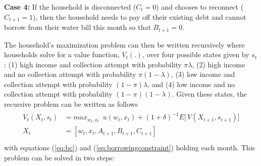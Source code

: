 \documentclass[12pt]{article}
\begin{document}
\textbf{Case 4:} If the household is disconnected ($C_t=0$) and chooses to reconnect ($C_{t+1}=1$), then the household needs to pay off their existing debt and cannot borrow from their water bill this month so that $B_{t+1} = 0$.  

The household's maximization problem can then be written recursively where households solve for a value function, $V_t(.)$, over four possible states given by $s_{t}$: (1) high income and collection attempt with probability $\pi\lambda$, (2) high income and no collection attempt with probability $\pi(1-\lambda)$, (3) low income and collection attempt with probability $(1-\pi)\lambda$, and (4) low income and no collection attempt with probability $(1-\pi)(1-\lambda)$.  Given these states, the recursive problem can be written as follows
\begin{align*}
\begin{split}
V_t(X_{t},s_t) &= max_{w_t,x_{t}} \,\,\, u(w_{t},x_{t}) + (1+\delta)^{-1}  E \Big[\, V(X_{t+1},s_{t+1})\Big] \\
X_t &= [w_t,x_t,A_{t+1},B_{t+1},C_{t+1}] \\
\end{split}
\end{align*}
with equations (\ref{eq:bc}) and (\ref{eq:borrowingconstraint}) holding each month.  This problem can be solved in two steps: 

\end{document}
